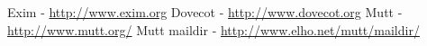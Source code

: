 \begin{thebibliography}{9}

	Exim - \url{http://www.exim.org}
	Dovecot - \url{http://www.dovecot.org}
	Mutt - \url{http://www.mutt.org/}
	Mutt maildir - \url{http://www.elho.net/mutt/maildir/}
	
\end{thebibliography}
